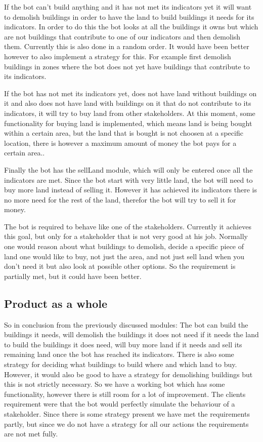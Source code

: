 If the bot can't build anything and it has not met its indicators yet it will want to demolish buildings in order to have the land to build buildings it needs for its indicators. In order to do this the bot looks at all the buildings it owns but which are not buildings that contribute to one of our indicators and then demolish them. Currently this is also done in a random order. It would have been better however to also implement a strategy for this. For example first demolish buildings in zones where the bot does not yet have buildings that contribute to its indicators. 

If the bot has not met its indicators yet, does not have land without buildings on it and also does not have land with buildings on it that do not contribute to its indicators, it will try to buy land from other stakeholders. At this moment, some functionality for buying land is implemented, which means land is being bought within a certain area, but the land that is bought is not choosen at a specific location, there is however a maximum amount of money the bot pays for a certain area..

Finally the bot has the sellLand module, which will only be entered once all the indicators are met. Since the bot start with very little land, the bot will need to buy more land instead of selling it. However it has achieved its indicators there is no more need for the rest of the land, therefor the bot will try to sell it for money.

The bot is required to behave like one of the stakeholders. Currently it achieves this goal, but only for a stakeholder that is not very good at his job. Normally one would reason about what buildings to demolish, decide a specific piece of land one would like to buy, not just the area, and not just sell land when you don't need it but also look at possible other options. So the requirement is partially met, but it could have been better.

\subsection{Product as a whole}
So in conclusion from the previously discussed modules: The bot can build the buildings it needs, will demolish the buildings it does not need if it needs the land to build the buildings it does need, will buy more land if it needs and sell its remaining land once the bot has reached its indicators. There is also some strategy for deciding what buildings to build where and which land to buy. However, it would also be good to have a strategy for demolishing buildings but this is not strictly necessary. So we have a working bot which has some functionality, however there is still room for a lot of improvement. The clients requirement were that the bot would perfectly simulate the behaviour of a stakeholder. Since there is some strategy present we have met the requirements partly, but since we do not have a strategy for all our actions the requirements are not met fully. 


